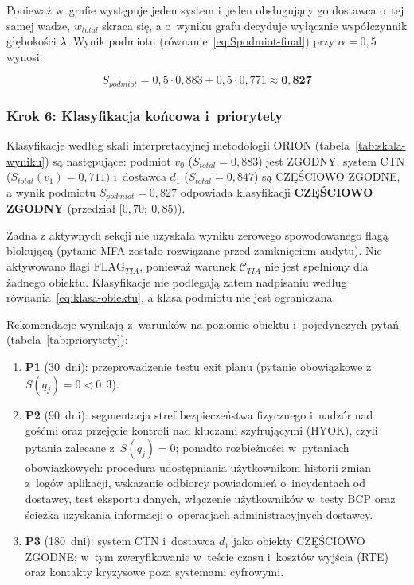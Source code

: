 \noindent Ponieważ w~grafie występuje jeden system i~jeden obsługujący go dostawca o~tej samej wadze, $w_{total}$ skraca się, a o~wyniku grafu decyduje wyłącznie współczynnik głębokości $\lambda$. Wynik podmiotu (równanie~\eqref{eq:Spodmiot-final}) przy $\alpha = 0{,}5$ wynosi:

\[
S_{podmiot} = 0{,}5 \cdot 0{,}883 + 0{,}5 \cdot 0{,}771 \approx \mathbf{0{,}827}
\]

\subsubsection*{Krok 6: Klasyfikacja końcowa i~priorytety}

Klasyfikacje według skali interpretacyjnej metodologii ORION (tabela~\ref{tab:skala-wyniku}) są następujące: podmiot $v_0$ ($S_{total} = 0{,}883$) jest \textsc{ZGODNY}, system CTN ($S_{total}(v_1) = 0{,}711$) i~dostawca $d_1$ ($S_{total} = 0{,}847$) są \textsc{CZĘŚCIOWO ZGODNE}, a wynik podmiotu $S_{podmiot} = 0{,}827$ odpowiada klasyfikacji \textbf{\textsc{CZĘŚCIOWO ZGODNY}} (przedział $[0{,}70;\ 0{,}85)$).

Żadna z aktywnych sekcji nie uzyskała wyniku zerowego spowodowanego flagą blokującą (pytanie MFA zostało rozwiązane przed zamknięciem audytu). Nie aktywowano flagi $\text{FLAG}_{TIA}$, ponieważ warunek $\mathcal{C}_{TIA}$ nie jest spełniony dla żadnego obiektu. Klasyfikacje nie podlegają zatem nadpisaniu według równania~\eqref{eq:klasa-obiektu}, a klasa podmiotu nie jest ograniczana.

Rekomendacje wynikają z~warunków na poziomie obiektu i~pojedynczych pytań (tabela~\ref{tab:priorytety}):
\begin{enumerate}[label=(\roman*)]
  \item \textbf{P1} (30~dni): przeprowadzenie testu exit planu (pytanie obowiązkowe z~$S(q_j) = 0 < 0{,}3$).
  \item \textbf{P2} (90~dni): segmentacja stref bezpieczeństwa fizycznego i~nadzór nad gośćmi oraz przejęcie kontroli nad kluczami szyfrującymi (HYOK), czyli pytania zalecane z~$S(q_j) = 0$; ponadto rozbieżności w~pytaniach obowiązkowych: procedura udostępniania użytkownikom historii zmian z~logów aplikacji, wskazanie odbiorcy powiadomień o~incydentach od dostawcy, test eksportu danych, włączenie użytkowników w~testy BCP oraz ścieżka uzyskania informacji o~operacjach administracyjnych dostawcy.
  \item \textbf{P3} (180~dni): system CTN i~dostawca $d_1$ jako obiekty \textsc{CZĘŚCIOWO ZGODNE}; w~tym zweryfikowanie w~teście czasu i~kosztów wyjścia (RTE) oraz kontakty kryzysowe poza systemami cyfrowymi.
\end{enumerate}

